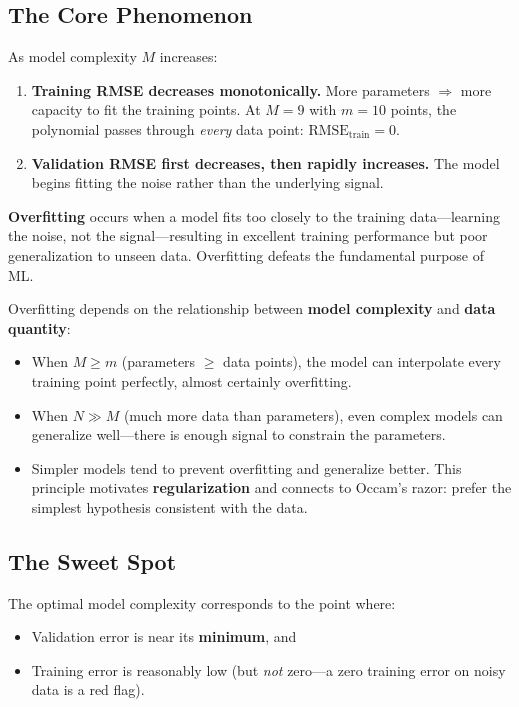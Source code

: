 \subsection*{The Core Phenomenon}

As model complexity $M$ increases:
\begin{enumerate}
    \item \textbf{Training RMSE decreases monotonically.} More parameters $\Rightarrow$ more capacity to fit the training points. At $M = 9$ with $m = 10$ points, the polynomial passes through \textit{every} data point: $\text{RMSE}_{\text{train}} = 0$.
    \item \textbf{Validation RMSE first decreases, then rapidly increases.} The model begins fitting the noise rather than the underlying signal.
\end{enumerate}

\begin{definition}[Overfitting]
\textbf{Overfitting} occurs when a model fits too closely to the training data---learning the noise, not the signal---resulting in excellent training performance but poor generalization to unseen data. Overfitting defeats the fundamental purpose of ML.
\end{definition}

\begin{remark}
Overfitting depends on the relationship between \textbf{model complexity} and \textbf{data quantity}:
\begin{itemize}
    \item When $M \geq m$ (parameters $\geq$ data points), the model can interpolate every training point perfectly, almost certainly overfitting.
    \item When $N \gg M$ (much more data than parameters), even complex models can generalize well---there is enough signal to constrain the parameters.
    \item Simpler models tend to prevent overfitting and generalize better. This principle motivates \textbf{regularization} and connects to Occam's razor: prefer the simplest hypothesis consistent with the data.
\end{itemize}
\end{remark}

\subsection*{The Sweet Spot}

The optimal model complexity corresponds to the point where:
\begin{itemize}
    \item Validation error is near its \textbf{minimum}, and
    \item Training error is reasonably low (but \textit{not} zero---a zero training error on noisy data is a red flag).
\end{itemize}

